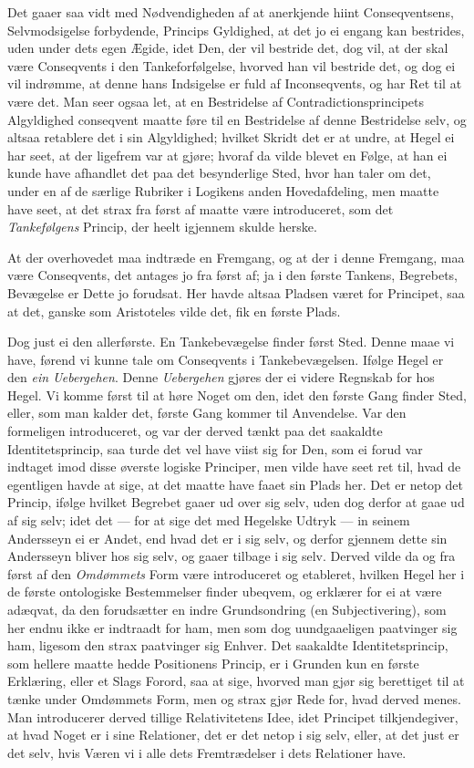 \documentclass[12pt,a4paper]{book}
\newcommand{\apage}[1]{\marginnote{\footnotesize\textit{[#1]}}}
\begin{document}
Det gaaer saa vidt med Nødvendigheden af at anerkjende hiint Conseqventsens,
Selvmodsigelse forbydende, Princips Gyldighed, at det jo ei engang kan
bestrides, uden under dets egen Ægide, idet Den, der vil bestride det, dog
vil, at der skal være Conseqvents i den Tankeforfølgelse, hvorved han vil
bestride det, og dog ei vil indrømme, at denne hans Indsigelse er fuld af
Inconseqvents, og har Ret til at være det. Man seer ogsaa let, at en
Bestridelse af Contradictionsprincipets Algyldighed conseqvent maatte føre
til en Bestridelse af denne Bestridelse selv, og altsaa retablere det i sin
Algyldighed; hvilket Skridt det er at undre, at Hegel ei har seet, at der
ligefrem var at gjøre; hvoraf da vilde blevet en Følge, at han ei kunde
have afhandlet det paa det besynderlige Sted, hvor han taler om det, under
en af de særlige Rubriker i Logikens anden Hovedafdeling, men maatte have
seet, at det strax fra først af maatte \apage{82} være introduceret, som det
\emph{Tankefølgens} Princip, der heelt igjennem skulde herske.

At der overhovedet maa indtræde en Fremgang, og at der i denne Fremgang,
maa være Conseqvents, det antages jo fra først af; ja i den første Tankens,
Begrebets, Bevægelse er Dette jo forudsat. Her havde altsaa Pladsen været
for Principet, saa at det, ganske som Aristoteles vilde det, fik en første
Plads.

Dog just ei den allerførste. En Tankebevægelse finder først Sted. Denne
maae vi have, førend vi kunne tale om Conseqvents i Tankebevægelsen. Ifølge
Hegel er den \emph{ein Uebergehen}. Denne \emph{Uebergehen} gjøres der ei videre Regnskab
for hos Hegel. Vi komme først til at høre Noget om den, idet den første
Gang finder Sted, eller, som man kalder det, første Gang kommer til
Anvendelse. Var den formeligen introduceret, og var der derved tænkt paa
det saakaldte Identitetsprincip, saa turde det vel have viist sig for Den,
som ei forud var indtaget imod disse øverste logiske Principer, men vilde
have seet ret til, hvad de egentligen havde at sige, at det maatte have
faaet sin Plads her. Det er netop det Princip, ifølge hvilket Begrebet
gaaer ud over sig selv, uden dog derfor at gaae ud af sig selv; idet det
--- for at sige det med Hegelske Udtryk --- in seinem Andersseyn ei er
Andet, end hvad det er i sig selv, og derfor gjennem dette sin Andersseyn
bliver hos sig selv, og gaaer tilbage i sig selv. Derved vilde da og fra
først af den \emph{Omdømmets} Form være introduceret og etableret, hvilken Hegel
her i de første ontologiske Bestemmelser finder ubeqvem, og erklærer for ei
at være adæqvat, da den forudsætter en indre Grundsondring (en
Subjectivering), som her endnu ikke er indtraadt for ham, men som dog
uundgaaeligen paatvinger sig ham, ligesom den strax paatvinger sig Enhver.
Det saakaldte Identitetsprincip, som hellere maatte hedde Positionens
Princip, er i Grunden kun en første Erklæring, eller et Slags Forord, saa
at sige, hvorved man gjør sig berettiget
\apage{83} til at tænke under Omdømmets Form, men og strax gjør Rede for, hvad derved
menes. Man introducerer derved tillige Relativitetens Idee, idet Principet
tilkjendegiver, at hvad Noget er i sine Relationer, det er det netop i sig
selv, eller, at det just er det selv, hvis Væren vi i alle dets
Fremtrædelser i dets Relationer have.
\end{document}
